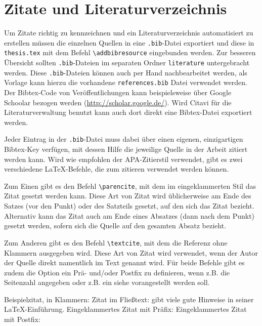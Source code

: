 \section{Zitate und Literaturverzeichnis}

Um Zitate richtig zu kennzeichnen und ein Literaturverzeichnis automatisiert zu erstellen müssen die einzelnen Quellen in eine \texttt{.bib}-Datei exportiert und diese in \texttt{thesis.tex} mit dem Befehl \texttt{\textbackslash{}addbibresource} eingebunden werden.
Zur besseren Übersicht sollten \texttt{.bib}-Dateien im separaten Ordner \texttt{literature} untergebracht werden.
Diese \texttt{.bib}-Dateien können auch per Hand nachbearbeitet werden, als Vorlage kann hierzu die vorhandene \texttt{references.bib} Datei verwendet werden.
Der Bibtex-Code von Veröffentlichungen kann beispielsweise über Google Schoolar bezogen werden (\href{http://scholar.google.de/}{http://scholar.google.de/}).
Wird Citavi für die Literaturverwaltung benutzt kann auch dort direkt eine Bibtex-Datei exportiert werden. 

Jeder Eintrag in der \texttt{.bib}-Datei muss dabei über einen eigenen, einzigartigen Bibtex-Key verfügen, mit dessen Hilfe die jeweilige Quelle in der Arbeit zitiert werden kann.
Wird wie empfohlen der APA-Zitierstil verwendet, gibt es zwei verschiedene \LaTeX{}-Befehle, die zum zitieren verwendet werden können.

Zum Einen gibt es den Befehl \texttt{\textbackslash{}parencite}, mit dem im eingeklammerten Stil das Zitat gesetzt werden kann.
Diese Art von Zitat wird üblicherweise am Ende des Satzes (vor den Punkt) oder des Satzteils gesetzt, auf den sich das Zitat bezieht.
Alternativ kann das Zitat auch am Ende eines Absatzes (dann nach dem Punkt) gesetzt werden, sofern sich die Quelle auf den gesamten Absatz bezieht.

Zum Anderen gibt es den Befehl \texttt{\textbackslash{}textcite}, mit dem die Referenz ohne Klammern ausgegeben wird.
Diese Art von Zitat wird verwendet, wenn der Autor der Quelle direkt namentlich im Text genannt wird.
Für beide Befehle gibt es zudem die Option ein Prä- und/oder Postfix zu definieren, wenn z.B. die Seitenzahl angegeben oder z.B. ein \glqq{}siehe\grqq{} vorangestellt werden soll.

Beispielzitat, in Klammern: \parencite{Amann.2013}\nl
Zitat im Fließtext: \textcite{Stein:2014} gibt viele gute Hinweise in seiner \LaTeX{}-Einführung.\nl
Eingeklammertes Zitat mit Präfix: \parencite[siehe auch][]{Amann.2013}\nl
Eingeklammertes Zitat mit Postfix: \parencite[][S.~5f.]{Amann.2013}

